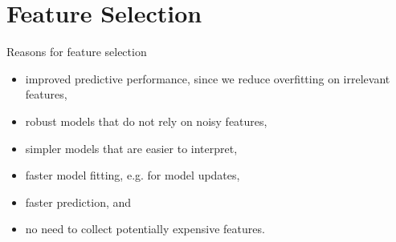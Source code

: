 \documentclass[11pt,compress,t,notes=noshow, aspectratio=169, xcolor=table]{beamer}
\begin{document}
\section{Feature Selection}

\begin{frame}{}

\end{frame}

\begin{frame}{}

\end{frame}

\begin{frame}{}

\end{frame}

\begin{frame}{}

\end{frame}

\begin{frame}{Reasons for feature selection}
\begin{itemize}
    \item improved predictive performance, since we reduce overfitting on irrelevant features,
    \item robust models that do not rely on noisy features,
    \item simpler models that are easier to interpret,
    \item faster model fitting, e.g. for model updates,
    \item faster prediction, and
    \item no need to collect potentially expensive features.
\end{itemize}
\end{frame}
\end{document}
